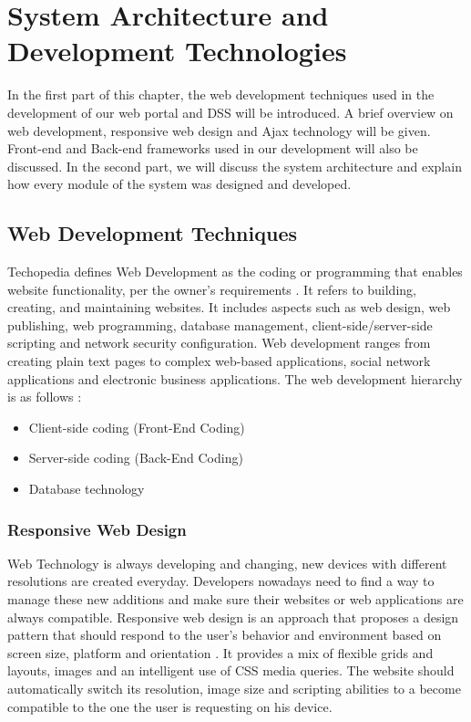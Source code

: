 \chapter{System Architecture and Development Technologies}
\label{ChapterFive}
In the first part of this chapter, the web development techniques used in the development of our web portal and DSS will be introduced. A brief overview on web development, responsive web design and Ajax technology will be given. Front-end and Back-end frameworks used in our development will also be discussed. In the second part, we will discuss the system architecture and explain how every module of the system was designed and developed.
\section{Web Development Techniques}
Techopedia defines Web Development as the coding or programming that enables website functionality, per the owner's requirements \cite{WebDevelopment}. It refers to building, creating, and maintaining websites. It includes aspects such as web design, web publishing, web programming, database management, client-side/server-side scripting and network security configuration. Web development ranges from creating plain text pages to complex web-based applications, social network applications and electronic business applications. The web development hierarchy is as follows \cite{WebDevelopment}:\\
\begin{itemize}
	\item Client-side coding (Front-End Coding)
	\item Server-side coding (Back-End Coding)
	\item Database technology
\end{itemize}
\subsection{Responsive Web Design}
Web Technology is always developing and changing, new devices with different resolutions are created everyday. Developers nowadays need to find a way to manage these new additions and make sure their websites or web applications are always compatible. Responsive web design is an approach that proposes a design pattern that should respond to the user’s behavior and environment based on screen size, platform and orientation \cite{RWD}. It provides a mix of flexible grids and layouts, images and an intelligent use of CSS media queries. The website should automatically switch its resolution, image size and scripting abilities to a become compatible to the one the user is requesting on his device.

